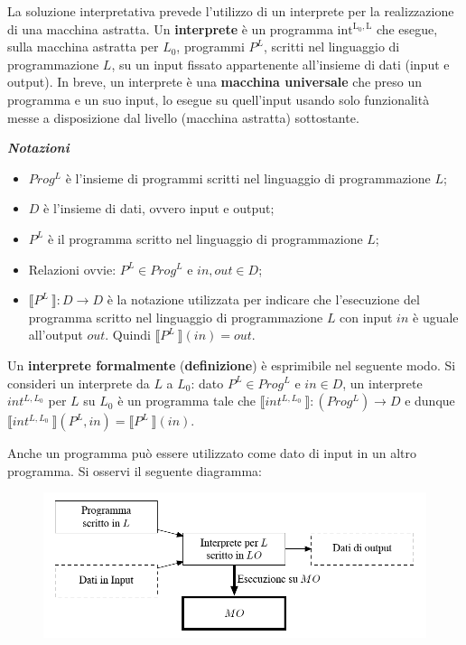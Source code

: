 \documentclass[a4paper]{article}
\newcommand{\exec}[1]{\llbracket #1\:\rrbracket}
\begin{document}
	La soluzione interpretativa prevede l'utilizzo di un interprete per la realizzazione di una macchina astratta. Un \textcolor{Red3}{\textbf{interprete}} è un programma $\mathrm{int}^{\mathrm{L_{0}, L}}$ che esegue, sulla macchina astratta per $L_{0}$, programmi $P^{L}$, scritti nel linguaggio di programmazione $L$, su un input fissato appartenente all'insieme di dati (input e output). In breve, un interprete è una \textbf{macchina universale} che preso un programma e un suo input, lo esegue su quell'input usando solo funzionalità messe a disposizione dal livello (macchina astratta) sottostante.
	\begin{center}
		\textcolor{Red3}{\textbf{\emph{Notazioni}}}
	\end{center}
	\begin{itemize}
		\item $Prog^{L}$ è l'insieme di programmi scritti nel linguaggio di programmazione $L$;
		\item $D$ è l'insieme di dati, ovvero input e output;
		\item $P^{L}$ è il programma scritto nel linguaggio di programmazione $L$;
		\item Relazioni ovvie: $P^{L} \in Prog^{L}$ e $in, out \in D$;
		\item $\exec{P^{L}}: D \longrightarrow D$ è la notazione utilizzata per indicare che l'esecuzione del programma scritto nel linguaggio di programmazione $L$ con input $in$ è uguale all'output $out$. Quindi $\exec{P^{L}}\left(in\right) = out$.
	\end{itemize}
	Un \textcolor{Red3}{\textbf{interprete formalmente}} (\textbf{definizione}) è esprimibile nel seguente modo. Si consideri un interprete da $L$ a $L_{0}$: dato $P^{L} \in Prog^{L}$ e $in \in D$, un interprete $int^{L, L_{0}}$ per $L$ su $L_{0}$ è un programma tale che $\exec{int^{L, L_{0}}}: \left(Prog^{L}\right) \longrightarrow D$ e dunque $\exec{int^{L, L_{0}}}\left(P^{L}, in\right) = \exec{P^{L}}\left(in\right)$.\newline
	
	\noindent
	Anche un programma può essere utilizzato come dato di input in un altro programma. Si osservi il seguente diagramma:
	\begin{figure}[!htp]
		\centering
		\includegraphics[width=\textwidth]{img/programma_input.png}
	\end{figure}
	
\end{document}
